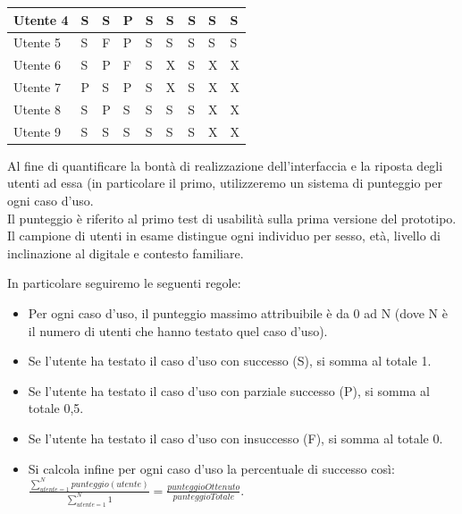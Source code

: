 \begin{table}[ht]
{\begin{tabular}{l|l|l|l|l|l|l|l|l|}
                \multicolumn{1}{|l|}{Utente 4} & S & S & P & S & S & S & S & S \\ \hline
                \multicolumn{1}{|l|}{Utente 5} & S & F & P & S & S & S & S & S \\ \hline
                \multicolumn{1}{|l|}{Utente 6} & S & P & F & S & X & S & X & X \\ \hline %
                \multicolumn{1}{|l|}{Utente 7} & P & S & P & S & X & S & X & X \\ \hline %
                \multicolumn{1}{|l|}{Utente 8} & S & P & S & S & S & S & X & X \\ \hline %
                \multicolumn{1}{|l|}{Utente 9} & S & S & S & S & S & S & X & X \\ \hline %
                \end{tabular}
                }
            \end{table}
            
            Al fine di quantificare la bontà di realizzazione dell'interfaccia e la riposta degli utenti ad essa (in particolare il primo, utilizzeremo un sistema di punteggio per ogni caso d'uso. \\
            Il punteggio è riferito al primo test di usabilità sulla prima versione del prototipo. \\
            Il campione di utenti in esame distingue ogni individuo per sesso, età, livello di inclinazione al digitale e contesto familiare.
            
            \noindent In particolare seguiremo le seguenti regole:
            \begin{itemize}
                \item Per ogni caso d'uso, il punteggio massimo attribuibile è da 0 ad N (dove N è il numero di utenti che hanno testato quel caso d'uso).
                \item Se l'utente ha testato il caso d'uso con successo (S), si somma al totale 1.
                \item Se l'utente ha testato il caso d'uso con parziale successo (P), si somma al totale 0,5.
                \item Se l'utente ha testato il caso d'uso con insuccesso (F), si somma al totale 0.
                \item Si calcola infine per ogni caso d'uso la percentuale di successo così:
                \vspace{0.5cm} \\
                $\displaystyle\frac{\sum_{utente = 1} ^{N}punteggio(utente)}{\sum_{utente = 1} ^{N}1} = \frac{punteggioOttenuto}{punteggioTotale}$.
            \end{itemize}


